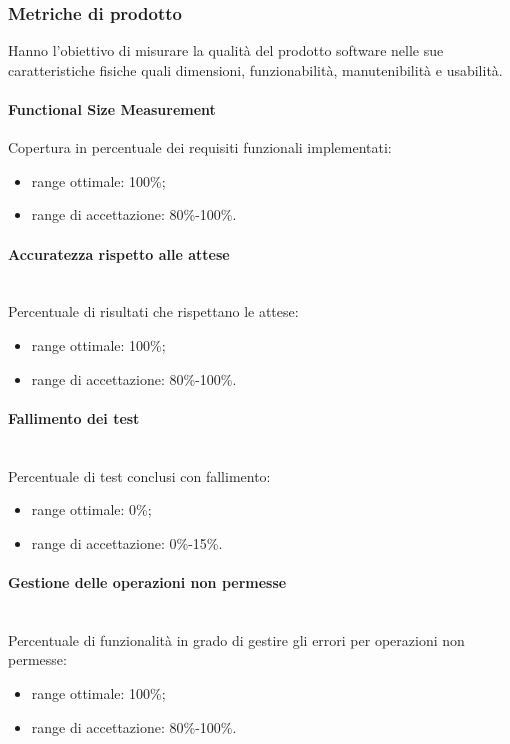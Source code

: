 \subsubsection{Metriche di prodotto}
Hanno l'obiettivo di misurare la qualità del prodotto software nelle sue caratteristiche fisiche quali dimensioni, funzionabilità, manutenibilità e usabilità.

\paragraph{Functional Size Measurement}\mbox{}
Copertura in percentuale dei requisiti funzionali implementati:
\begin{itemize}
	\item range ottimale: 100\%;
	\item range di accettazione: 80\%-100\%.
\end{itemize}

\paragraph{Accuratezza rispetto alle attese}\mbox{}\\
Percentuale di risultati che rispettano le attese:
\begin{itemize}
	\item range ottimale: 100\%;
	\item range di accettazione: 80\%-100\%.
\end{itemize}

\paragraph{Fallimento dei test}\mbox{}\\
Percentuale di test conclusi con fallimento:
\begin{itemize}
	\item range ottimale: 0\%;
	\item range di accettazione: 0\%-15\%.
\end{itemize}

\paragraph{Gestione delle operazioni non permesse}\mbox{}\\
Percentuale di funzionalità in grado di gestire gli errori per operazioni non permesse:
\begin{itemize}
	\item range ottimale: 100\%;
	\item range di accettazione: 80\%-100\%.
\end{itemize}


